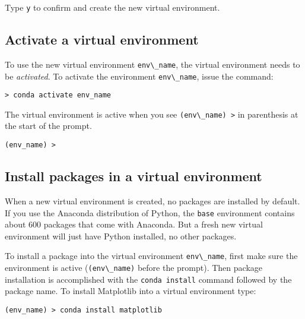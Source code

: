\documentclass{book}
\newcommand{\passthrough}[1]{#1}
\begin{document}
Type \passthrough{\lstinline!y!} to confirm and create the new virtual
environment.
    




    
        \hypertarget{activate-a-virtual-environment}{%
\subsection{Activate a virtual
environment}\label{activate-a-virtual-environment}}

To use the new virtual environment \passthrough{\lstinline!env\_name!},
the virtual environment needs to be \emph{activated}. To activate the
environment \passthrough{\lstinline!env\_name!}, issue the command:

\begin{lstlisting}
> conda activate env_name
\end{lstlisting}

The virtual environment is active when you see
\passthrough{\lstinline!(env\_name) >!} in parenthesis at the start of
the prompt.

\begin{lstlisting}
(env_name) > 
\end{lstlisting}
    




    
        \hypertarget{install-packages-in-a-virtual-environment}{%
\subsection{Install packages in a virtual
environment}\label{install-packages-in-a-virtual-environment}}

When a new virtual environment is created, no packages are installed by
default. If you use the Anaconda distribution of Python, the
\passthrough{\lstinline!base!} environment contains about 600 packages
that come with Anaconda. But a fresh new virtual environment will just
have Python installed, no other packages.

To install a package into the virtual environment
\passthrough{\lstinline!env\_name!}, first make sure the environment is
active (\passthrough{\lstinline!(env\_name)!} before the prompt). Then
package installation is accomplished with the
\passthrough{\lstinline!conda install!} command followed by the package
name. To install Matplotlib into a virtual environment type:

\begin{lstlisting}
(env_name) > conda install matplotlib
\end{lstlisting}
\end{document}
